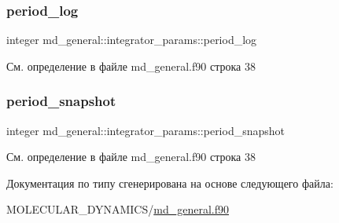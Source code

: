 \subsubsection{\texorpdfstring{period\+\_\+log}{period\_log}}
{\footnotesize\ttfamily integer md\+\_\+general\+::integrator\+\_\+params\+::period\+\_\+log}



См. определение в файле md\+\_\+general.\+f90 строка 38

\mbox{\label{structmd__general_1_1integrator__params_a9ccbea50d63a4ed071c21f441e12ebbf}} 
\subsubsection{\texorpdfstring{period\+\_\+snapshot}{period\_snapshot}}
{\footnotesize\ttfamily integer md\+\_\+general\+::integrator\+\_\+params\+::period\+\_\+snapshot}



См. определение в файле md\+\_\+general.\+f90 строка 38



Документация по типу сгенерирована на основе следующего файла\+:\begin{DoxyCompactItemize}
\item 
M\+O\+L\+E\+C\+U\+L\+A\+R\+\_\+\+D\+Y\+N\+A\+M\+I\+C\+S/\mbox{\hyperlink{md__general_8f90}{md\+\_\+general.\+f90}}\end{DoxyCompactItemize}
